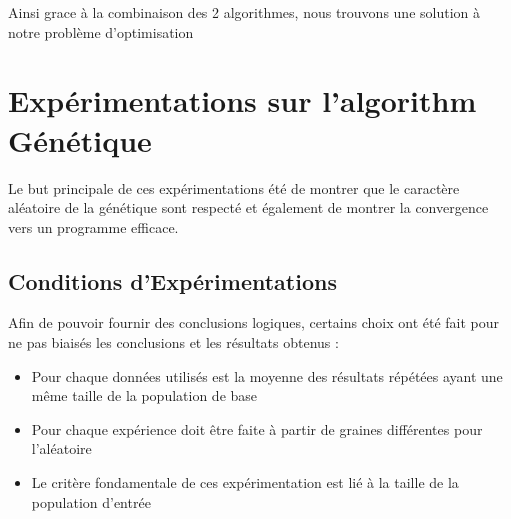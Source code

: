 \documentclass[12pt]{article}
\begin{document}
Ainsi grace à la combinaison des 2 algorithmes, nous trouvons une solution à notre problème
d'optimisation
\section{Expérimentations sur l'algorithm Génétique}
Le but principale de ces expérimentations été de montrer que le caractère aléatoire de la génétique sont respecté et également de montrer la convergence vers un programme efficace.
\subsection*{Conditions d'Expérimentations}
Afin de pouvoir fournir des conclusions logiques, certains choix ont été
fait pour ne pas biaisés les conclusions et les résultats obtenus :

\begin{itemize}
	\item Pour chaque données utilisés est la moyenne des résultats répétées ayant une même taille de la population de base
	\item Pour chaque expérience doit être faite à partir de graines différentes pour l'aléatoire
	\item Le critère fondamentale de ces expérimentation est lié à la taille de la population d'entrée
\end{itemize}
\end{document}
